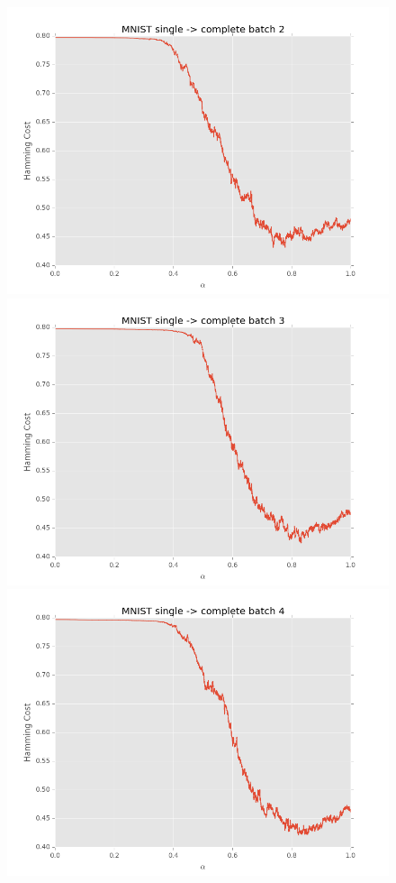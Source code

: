 \begin{figure}[h]
\begin{minipage}{.3\textwidth}
  \includegraphics[width=\linewidth]{images/mnist-sc-2}
\end{minipage}
\begin{minipage}{.3\textwidth}
  \centering
  \includegraphics[width=\linewidth]{images/mnist-sc-3}
\end{minipage}
\begin{minipage}{.3\textwidth}
  \centering
  \includegraphics[width=\linewidth]{images/mnist-sc-4}

\end{minipage}
\end{figure}
